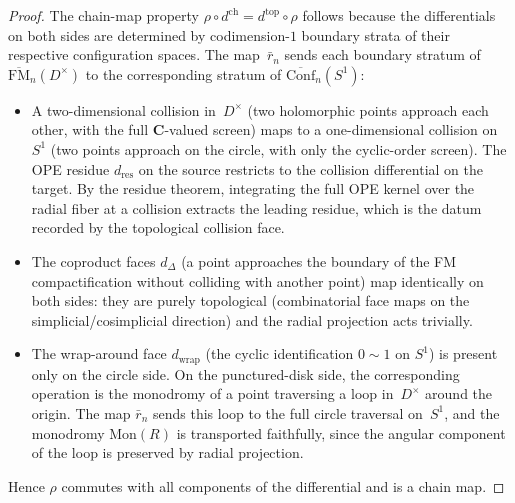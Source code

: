 \begin{proof}
The chain-map property
$\rho\circ d^{\mathrm{ch}}=d^{\mathrm{top}}\circ\rho$
follows because the differentials on both sides are
determined by codimension-$1$ boundary strata of
their respective configuration spaces. The map~$\bar r_n$
sends each boundary stratum of
$\overline{\mathrm{FM}}_n(D^\times)$ to the
corresponding stratum of
$\overline{\mathrm{Conf}}_n(S^1)$:
\begin{itemize}
\item A two-dimensional collision in~$D^\times$
 (two holomorphic points approach each other, with
 the full $\mathbf{C}$-valued screen) maps to a
 one-dimensional collision on~$S^1$ (two points
 approach on the circle, with only the cyclic-order
 screen). The OPE residue $d_{\mathrm{res}}$ on the
 source restricts to the collision differential on the
 target. By the residue theorem, integrating the full
 OPE kernel over the radial fiber at a collision
 extracts the leading residue, which is the datum
 recorded by the topological collision face.
\item The coproduct faces $d_\Delta$ (a point
 approaches the boundary of the FM compactification
 without colliding with another point) map identically
 on both sides: they are purely topological
 (combinatorial face maps on the simplicial/cosimplicial
 direction) and the radial projection acts trivially.
\item The wrap-around face $d_{\mathrm{wrap}}$ (the
 cyclic identification $0\sim 1$ on $S^1$) is present
 only on the circle side. On the punctured-disk side,
 the corresponding operation is the monodromy of a
 point traversing a loop in~$D^\times$ around the
 origin. The map $\bar r_n$ sends this loop to the
 full circle traversal on~$S^1$, and the monodromy
 $\mathrm{Mon}(R)$ is transported faithfully, since
 the angular component of the loop is preserved by
 radial projection.
\end{itemize}
Hence $\rho$ commutes with all components of the
differential and is a chain map.


\end{proof}

